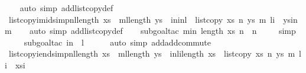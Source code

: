 \begin{isabellebody}
%
\isadelimproof
\ \ %
\endisadelimproof
%
\isatagproof
{}\isamarkupfalse%
\ {\isacharparenleft}auto\ simp\ add{\isacharcolon}list{\isacharunderscore}copy{\isacharunderscore}def{\isacharparenright}\isanewline
\ \ \isamarkupfalse%
%
\endisatagproof
{\isafoldproof}%
%
\isadelimproof
\isanewline
%
\endisadelimproof
{}\isamarkupfalse%
\ list{\isacharunderscore}copy{\isacharunderscore}i{\isacharunderscore}mid{\isacharbrackleft}simp{\isacharbrackright}{\isacharcolon}{\isachardoublequoteopen}{\isacharparenleft}n{\isacharplus}l{\isacharparenright}{\isasymle}length\ xs\ {\isasymLongrightarrow}\ {\isacharparenleft}m{\isacharplus}l{\isacharparenright}{\isasymle}length\ ys\ {\isasymLongrightarrow}\ i{\isasymge}n{\isasymand}i{\isacharless}{\isacharparenleft}n{\isacharplus}l{\isacharparenright}\ {\isasymLongrightarrow}\ {\isacharparenleft}list{\isacharunderscore}copy\ xs\ n\ ys\ m\ l{\isacharparenright}{\isacharbang}i\ {\isacharequal}\ ys{\isacharbang}{\isacharparenleft}i{\isacharminus}n{\isacharplus}m{\isacharparenright}{\isachardoublequoteclose}\isanewline
%
\isadelimproof
\ \ %
\endisadelimproof
%
\isatagproof
{}\isamarkupfalse%
\ {\isacharparenleft}auto\ simp\ add{\isacharcolon}list{\isacharunderscore}copy{\isacharunderscore}def{\isacharparenright}\isanewline
\ \ \isamarkupfalse%
\ {\isacharparenleft}subgoal{\isacharunderscore}tac\ {\isachardoublequoteopen}min\ {\isacharparenleft}length\ xs{\isacharparenright}\ n\ {\isacharequal}\ n{\isachardoublequoteclose}{\isacharparenright}\isanewline
\ \ \ \isamarkupfalse%
\ {\isacharparenleft}simp{\isacharparenright}\isanewline
\ \ \ \isamarkupfalse%
\ {\isacharparenleft}subgoal{\isacharunderscore}tac\ {\isachardoublequoteopen}i{\isacharminus}n\ {\isacharless}\ l{\isachardoublequoteclose}{\isacharparenright}\isanewline
\ \ \ \ \isamarkupfalse%
\ {\isacharparenleft}auto\ simp\ add{\isacharcolon}add{\isachardot}commute{\isacharparenright}\isanewline
\ \ \isamarkupfalse%
%
\endisatagproof
{\isafoldproof}%
%
\isadelimproof
\isanewline
%
\endisadelimproof
\ \ \isanewline
{}\isamarkupfalse%
\ list{\isacharunderscore}copy{\isacharunderscore}i{\isacharunderscore}end{\isacharbrackleft}simp{\isacharbrackright}{\isacharcolon}{\isachardoublequoteopen}{\isacharparenleft}n{\isacharplus}l{\isacharparenright}{\isasymle}length\ xs\ {\isasymLongrightarrow}\ {\isacharparenleft}m{\isacharplus}l{\isacharparenright}{\isasymle}length\ ys\ {\isasymLongrightarrow}\ i{\isasymge}n{\isacharplus}l{\isasymand}i{\isacharless}length\ xs\ {\isasymLongrightarrow}\ {\isacharparenleft}list{\isacharunderscore}copy\ xs\ n\ ys\ m\ l{\isacharparenright}{\isacharbang}i\ {\isacharequal}\ xs{\isacharbang}i{\isachardoublequoteclose}\isanewline

\end{isabellebody}
